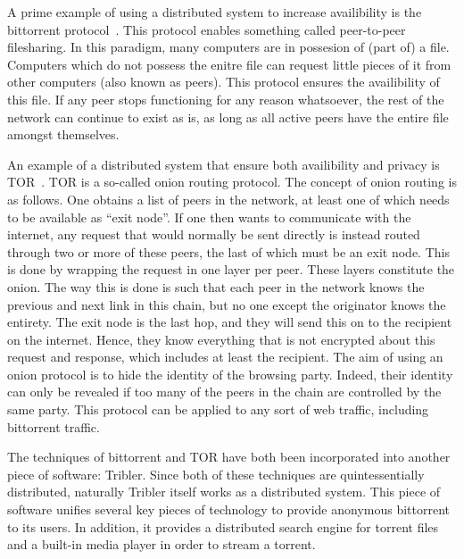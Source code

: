 \documentclass[a4paper,11pt]{book}
\theoremstyle{definition}
\begin{document}
A prime example of using a distributed system to increase availibility is the 
bittorrent protocol~\cite{cohen2008bittorrent}. This protocol enables something called peer-to-peer filesharing.
In this paradigm, many computers are in possesion of (part of) a file. Computers
which do not possess the enitre file can request little pieces of it from other
computers (also known as peers). This protocol ensures the availibility of this
file. If any peer stops functioning for any reason whatsoever, the rest of
the network can continue to exist as is, as long as all active peers have the
entire file amongst themselves. 

An example of a distributed system that ensure both availibility and privacy is
TOR~\cite{dingledine2004tor}. TOR is a so-called onion routing protocol. 
The concept of onion routing is as follows. One obtains a list of peers in the
network, at least one of which needs to be available as ``exit node''. If one
then wants to communicate with the internet, any request that would normally
be sent directly is instead routed through two or more of these peers, the last
of which must be an exit node. This is done by wrapping the request in one
layer per peer. These layers constitute the onion. The way this is done is such
that each peer in the network knows the previous and next link in this chain,
but no one except the originator knows the entirety. The exit node is the last
hop, and they will send this on to the recipient on the internet. Hence, they
know everything that is not encrypted about this request and response, which includes at
least the recipient. 
The aim of using an onion protocol is to hide the identity of the browsing party. Indeed,
their identity can only be revealed if too many of the peers in the chain are controlled
by the same party. This protocol can be applied to any sort of web traffic, including
bittorrent traffic. 

The techniques of bittorrent and TOR have both been incorporated into another piece
of software: Tribler. Since both of these techniques are quintessentially distributed,
naturally Tribler itself works as a distributed system. This piece of software unifies
several key pieces of technology to provide anonymous bittorrent to its users. In addition,
it provides a distributed search engine for torrent files and a built-in media player in
order to stream a torrent. 
\end{document}
